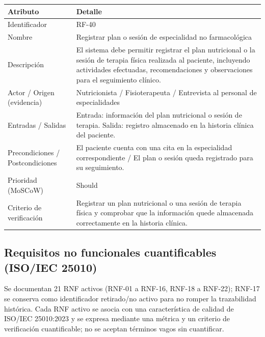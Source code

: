 \documentclass[11pt,a4paper]{article}
\begin{document}
	\begin{longtable}{p{} p{}}
		
		\toprule
		\textbf{Atributo} & \textbf{Detalle} \\
		\midrule
		\endhead
		
		Identificador & RF-40 \\
		Nombre & Registrar plan o sesión de especialidad no farmacológica \\
		Descripción & El sistema debe permitir registrar el plan nutricional o la sesión de terapia física realizada al paciente, incluyendo actividades efectuadas, recomendaciones y observaciones para el seguimiento clínico. \\
		Actor / Origen (evidencia) & Nutricionista / Fisioterapeuta / Entrevista al personal de especialidades \\
		Entradas / Salidas & Entrada: información del plan nutricional o sesión de terapia. Salida: registro almacenado en la historia clínica del paciente. \\
		Precondiciones / Postcondiciones & El paciente cuenta con una cita en la especialidad correspondiente / El plan o sesión queda registrado para su seguimiento. \\
		Prioridad (MoSCoW) & Should \\
		Criterio de verificación & Registrar un plan nutricional o una sesión de terapia física y comprobar que la información quede almacenada correctamente en la historia clínica. \\
		
		\bottomrule
		
	\end{longtable}
	
	
	\subsection{ Requisitos no funcionales cuantificables (ISO/IEC 25010)}
	
	Se documentan 21 RNF activos (RNF-01 a RNF-16, RNF-18 a RNF-22); RNF-17 se conserva como identificador retirado/no activo para no romper la trazabilidad histórica. Cada RNF activo se asocia con una característica de calidad de ISO/IEC 25010:2023 \cite{iso25010} y se expresa mediante una métrica y un criterio de verificación cuantificable; no se aceptan términos vagos sin cuantificar.
	
\end{document}
